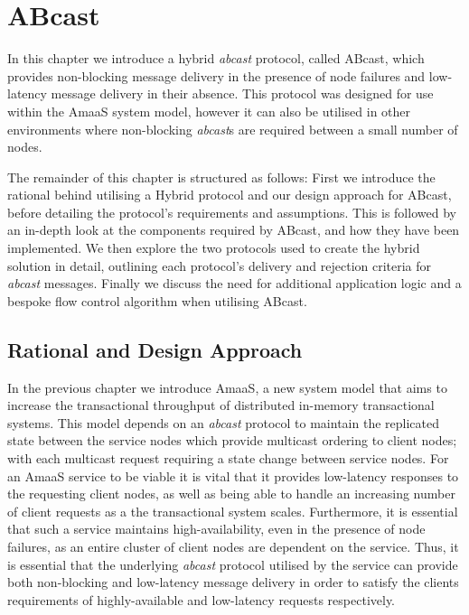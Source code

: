 \chapter{ABcast}

    \graphicspath{{Chapter4-ABcast/Figs/Vector/}{Chapter4-ABcast/Figs/}}

In this chapter we  introduce a hybrid \emph{abcast} protocol, called \textsf{ABcast}, which provides non-blocking message delivery in the presence of node failures and low-latency message delivery in their absence.  This protocol was designed for use within the \textsf{AmaaS} system model, however it can also be utilised in other environments where non-blocking \emph{abcast}s are required between a small number of nodes.  

The remainder of this chapter is structured as follows:  First we introduce the rational behind utilising a Hybrid protocol and our design approach for \textsf{ABcast}, before detailing the protocol's requirements and assumptions.  This is followed by an in-depth look at the components required by \textsf{ABcast}, and how they have been implemented.  We then explore the two protocols used to create the hybrid solution in detail, outlining each protocol's delivery and rejection criteria for \emph{abcast} messages. Finally we discuss the need for additional application logic and a bespoke flow control algorithm when utilising \textsf{ABcast}.  

\section{Rational and Design Approach}
    In the previous chapter we introduce \textsf{AmaaS}, a new system model that aims to increase the transactional throughput of distributed in-memory transactional systems.  This model depends on an \emph{abcast} protocol to maintain the replicated state between the service nodes which provide multicast ordering to client nodes; with each multicast request requiring a state change between service nodes.  For an \textsf{AmaaS} service to be viable it is vital that it provides low-latency responses to the requesting client nodes, as well as being able to handle an increasing number of client requests as a the transactional system scales.  Furthermore, it is essential that such a service maintains high-availability, even in the presence of node failures, as an entire cluster of client nodes are dependent on the service.  Thus, it is essential that the underlying \emph{abcast} protocol utilised by the service can provide both non-blocking and low-latency message delivery in order to satisfy the clients requirements of highly-available and low-latency requests respectively.  
    
